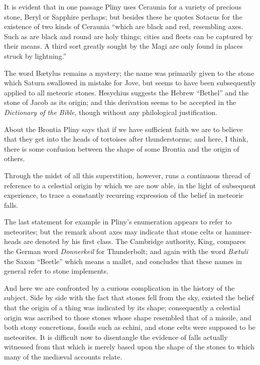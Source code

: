 \documentclass[a4paper, 11pt, oneside]{article}
\begin{document}
It is evident that in one passage Pliny uses Ceraunia for a variety of precious stone, Beryl or Sapphire perhaps; but besides these he quotes Sotacus for the existence of two kinds of Ceraunia ``which are black and red, resembling axes. Such as are black and round are holy things; cities and fleets can be captured by their means. A third sort greatly sought by the Magi are only found in places struck by lightning.'' 

The word Bætylus remains a mystery; the name was primarily given to the stone which Saturn swallowed in mistake for Jove, but seems to have been subsequently applied to all meteoric stones. Hesychius suggests the Hebrew ``Bethel'' and the stone of Jacob as its origin; and this derivation seems to be accepted in the \emph{Dictionary of the Bible}, though without any philological justification. 

About the Brontia Pliny says that if we have sufficient faith we are to believe that they get into the heads of tortoises after thunderstorms; and here, I think, there is some confusion between the shape of some Brontia and the origin of others. 

Through the midst of all this superstition, however, runs a continuous thread of reference to a celestial origin by which we are now able, in the light of subsequent experience, to trace a constantly recurring expression of the belief in meteoric falls. 

The last statement for example in Pliny's enumeration appears to refer to meteorites; but the remark about axes may indicate that stone celts or hammer-heads are denoted by his first class. The Cambridge authority, King, compares the German word \emph{Donnerkeil} for Thunderbolt; and again with the word \emph{Bætuli} the Saxon ``Beetle'' which means a mallet, and concludes that these names in general refer to stone implements. 

And here we are confronted by a curious complication in the history of the subject. Side by side with the fact that stones fell from the sky, existed the belief that the origin of a thing was indicated by its shape; consequently a celestial origin was ascribed to those stones whose shape resembled that of a missile, and both stony concretions, fossils such as echini, and stone celts were supposed to be meteorites. It is difficult now to disentangle the evidence of falls actually witnessed from that which is merely based upon the shape of the stones to which many of the mediæval accounts relate. 
\end{document}
